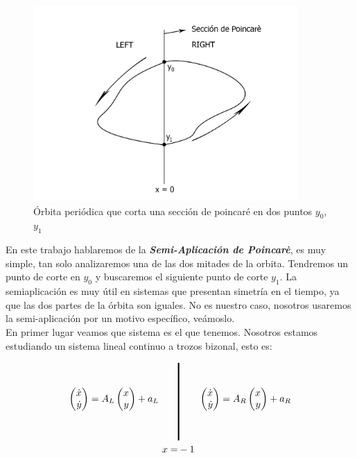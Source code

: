 \documentclass[12pt,a4paper]{report} %
\begin{document}
	\begin{figure}[h]
		\centering
		\includegraphics[width=0.9\textwidth]{aplipoincarerandom.jpg}
		\caption{Órbita periódica que corta una sección de poincaré en dos puntos $y_0$, $y_1$}
		\label{fig:aplicpoincarerandom}
	\end{figure}\smallskip
	\newpage
	
	
	En este trabajo hablaremos de la \textit{\textbf{Semi-Aplicación de Poincarè}}, es muy simple, tan solo analizaremos una de las dos mitades de la orbita. Tendremos un punto de corte en $y_0$ y buscaremos el siguiente punto de corte $y_1$. La semiaplicación es muy útil en sistemas que presentan simetría en el tiempo, ya que las dos partes de la órbita son iguales. No es nuestro caso, nosotros usaremos la semi-aplicación por un motivo específico, veámoslo.\\[0.5cm]
	En primer lugar veamos que sistema es el que tenemos. Nosotros estamos estudiando un sistema lineal continuo a trozos bizonal, esto es:
	
    \begin{equation}
    	\label{eq:sisttroz}
    	\begin{aligned}
    	\begin{pmatrix*}[r]
    		\dot{x}\\ \dot{y}
    	\end{pmatrix*}=A_L\begin{pmatrix*}[r]
    	x \\ y
    	\end{pmatrix*}+a_L \qquad 
    		&\rule[-40pt]{1.5pt}{80pt} \qquad 
    		\begin{pmatrix*}[r]
    			\dot{x}\\ \dot{y}
    		\end{pmatrix*}=A_R\begin{pmatrix*}[r]
    			x \\ y
    		\end{pmatrix*}+a_R \\ x=&-1
    	\end{aligned}
    \end{equation}\smallskip
    
\end{document}
